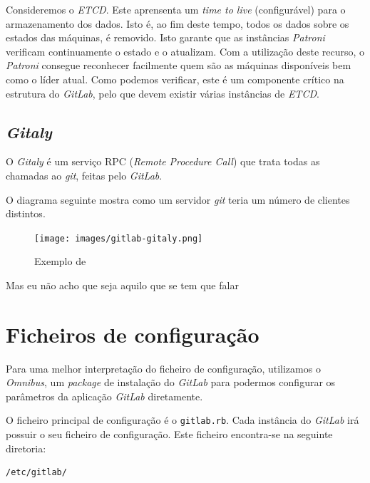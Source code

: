 \documentclass[12pt,a4paper]{article}
\begin{document}
Consideremos o \emph{ETCD}. Este aprensenta um \emph{time to live} (configurável) para o armazenamento dos dados. Isto é, ao fim deste tempo, todos os dados sobre os estados das máquinas, é removido. Isto garante que as instâncias \emph{Patroni} verificam continuamente o estado e o atualizam. Com a utilização deste recurso, o \emph{Patroni} consegue reconhecer facilmente quem são as máquinas disponíveis bem como o líder atual. Como podemos verificar, este é um componente crítico na estrutura do \emph{GitLab}, pelo que devem existir várias instâncias de \emph{ETCD}.



\subsection{\emph{Gitaly}}

O \emph{Gitaly} é um serviço RPC (\emph{Remote Procedure Call}) que trata todas as chamadas ao \emph{git}, feitas pelo \emph{GitLab}.

O diagrama seguinte mostra como um servidor \emph{git} teria um número de clientes distintos.

\begin{figure}[H]
  \centering
  \texttt{[image: images/gitlab-gitaly.png]}
  \caption{Exemplo de }
\end{figure}

Mas eu não acho que seja aquilo que se tem que falar



\newpage
\section{Ficheiros de configuração}

Para uma melhor interpretação do ficheiro de configuração, utilizamos o \emph{Omnibus}, um \emph{package} de instalação do \emph{GitLab} para podermos configurar os parâmetros da aplicação \emph{GitLab} diretamente.

O ficheiro principal de configuração é o \texttt{gitlab.rb}. Cada instância do \emph{GitLab} irá possuir o seu ficheiro de configuração. Este ficheiro encontra-se na seguinte diretoria:

\begin{verbatim}
/etc/gitlab/
\end{verbatim}
\end{document}
